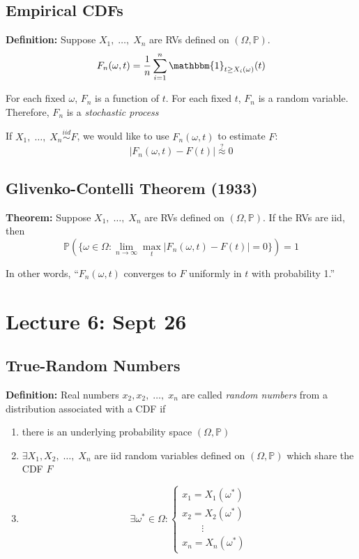 \documentclass[12pt]{article}
\renewcommand{\P}{\mathbb{P}}
\newcommand{\ind}{\mathbbm{1}}
\newcommand{\ellipsis}{\; \dots, \;}
\begin{document}
\subsection{Empirical CDFs}
\textbf{Definition:} Suppose $X_1, \ellipsis X_n$ are RVs defined on $(\Omega, \P)$. 
\[F_n(\omega, t) = \frac{1}{n}\sum_{i=1}^n \ind_{t \geq X_i(\omega)}(t)\]

For each fixed $\omega$, $F_n$ is a function of $t$. For each fixed $t$, $F_n$ is a random variable. Therefore, $F_n$ is a \emph{stochastic process}

If $X_1, \ellipsis X_n \overset{iid}{\sim} F$, we would like to use $F_n(\omega, t)$ to estimate $F$:
\[|F_n(\omega, t) - F(t)| \overset{?}{\approx} 0\]

\subsection{Glivenko-Contelli Theorem (1933)}
\textbf{Theorem:} Suppose $X_1, \ellipsis X_n$ are RVs defined on $(\Omega, \P)$. If the RVs are iid, then 
\[\P(\{\omega \in \Omega: \lim_{n\to \infty} \max_t|F_n(\omega, t) - F(t)| = 0\}) = 1\]

In other words, ``$F_n(\omega, t)$ converges to $F$ uniformly in $t$ with probability 1.''

\section{Lecture 6: Sept 26}
\subsection{True-Random Numbers}
\textbf{Definition:} Real numbers $x_2, x_2, \ellipsis x_n$ are called \emph{random numbers} from a distribution associated with a CDF if 
\begin{enumerate}
    \item there is an underlying probability space $(\Omega, \P)$
    \item $\exists X_1, X_2, \ellipsis X_n$ are iid random variables defined on $(\Omega, \P)$ which share the CDF $F$
    \item 
    \[\exists \omega^* \in \Omega: \begin{cases}
        x_1 = X_1(\omega^*)\\
        x_2 = X_2(\omega^*)\\
        \qquad \vdots\\
        x_n = X_n(\omega^*)
    \end{cases}\]
\end{enumerate}
\end{document}
